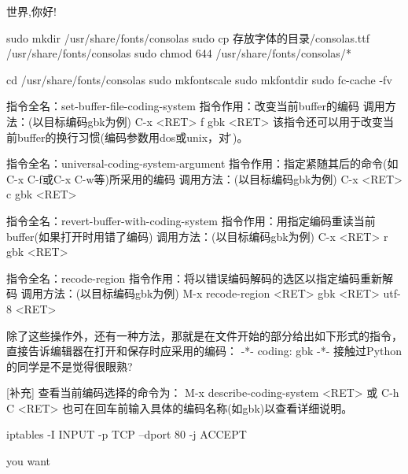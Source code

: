 \documentclass[11pt,a4paper]{article}
\begin{document}
世界,你好!

      sudo mkdir /usr/share/fonts/consolas
      sudo cp 存放字体的目录/consolas.ttf  /usr/share/fonts/consolas
      sudo chmod 644 /usr/share/fonts/consolas/* 

      cd /usr/share/fonts/consolas
      sudo mkfontscale
      sudo mkfontdir 
      sudo fc-cache -fv 

指令全名：set-buffer-file-coding-system
指令作用：改变当前buffer的编码
调用方法：(以目标编码gbk为例)
C-x <RET> f gbk <RET>
该指令还可以用于改变当前buffer的换行习惯(编码参数用dos或unix，对应\r{}\n)。

指令全名：universal-coding-system-argument
指令作用：指定紧随其后的命令(如C-x C-f或C-x C-w等)所采用的编码
调用方法：(以目标编码gbk为例)
C-x <RET> c gbk <RET>

指令全名：revert-buffer-with-coding-system
指令作用：用指定编码重读当前buffer(如果打开时用错了编码)
调用方法：(以目标编码gbk为例)
C-x <RET> r gbk <RET>

指令全名：recode-region
指令作用：将以错误编码解码的选区以指定编码重新解码
调用方法：(以目标编码gbk为例)
M-x recode-region <RET> gbk <RET> utf-8 <RET>

除了这些操作外，还有一种方法，那就是在文件开始的部分给出如下形式的指令，直接告诉编辑器在打开和保存时应采用的编码：
-*- coding: gbk -*-
接触过Python的同学是不是觉得很眼熟?

[补充] 查看当前编码选择的命令为：
M-x describe-coding-system <RET> 或 C-h C <RET>
也可在回车前输入具体的编码名称(如gbk)以查看详细说明。

iptables -I INPUT -p TCP --dport 80 -j ACCEPT  


 you want
\end{document}
